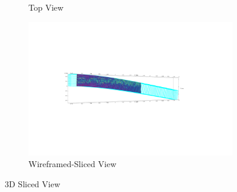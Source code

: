 \documentclass[a4paper,11pt]{article}
\begin{document}
\begin{figure}[h!]
\begin{subfigure}[b]{0.5\linewidth}
		\caption{Top View}
	\end{subfigure}
	\quad
	\begin{subfigure}[b]{0.5\linewidth}
		\centering
		\includegraphics[width=\linewidth]{picture/conference/3dslice9}
		\caption{Wireframed-Sliced View}
	\end{subfigure}
	\caption{3D Sliced View}
	\label{fig:3dsliceview}
\end{figure}
\newpage
\end{document}
